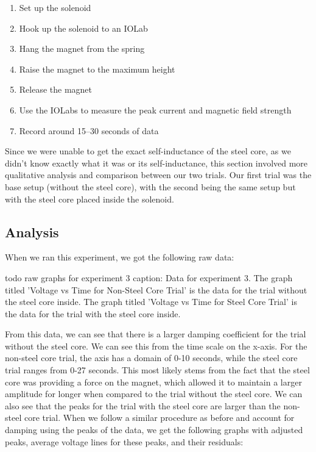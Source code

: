 \documentclass[11pt]{article}
\begin{document}
    \begin{enumerate}
        \item Set up the solenoid
        \item Hook up the solenoid to an IOLab
        \item Hang the magnet from the spring
        \item Raise the magnet to the maximum height
        \item Release the magnet
        \item Use the IOLabs to measure the peak current and magnetic field strength
        \item Record around 15--30 seconds of data
    \end{enumerate}

    Since we were unable to get the exact self-inductance of the steel core, as we didn't know exactly what it was or its self-inductance, this section involved more qualitative analysis and comparison between our two trials. Our first trial was the base setup (without the steel core), with the second being the same setup but with the steel core placed inside the solenoid.

    \subsection{Analysis}\label{subsec:part_3_analsysis}
    When we ran this experiment, we got the following raw data:

    todo raw graphs for experiment 3
    caption: Data for experiment 3. The graph titled 'Voltage vs Time for Non-Steel Core Trial' is the data for the trial without the steel core inside. The graph titled 'Voltage vs Time for Steel Core Trial' is the data for the trial with the steel core inside. 

    From this data, we can see that there is a larger damping coefficient for the trial without the steel core. We can see this from the time scale on the x-axis. For the non-steel core trial, the axis has a domain of 0-10 seconds, while the steel core trial ranges from 0-27 seconds. This most likely stems from the fact that the steel core was providing a force on the magnet, which allowed it to maintain a larger amplitude for longer when compared to the trial without the steel core.
    We can also see that the peaks for the trial with the steel core are larger than the non-steel core trial. When we follow a similar procedure as before and account for damping using the peaks of the data, we get the following graphs with adjusted peaks, average voltage lines for these peaks, and their residuals:
\end{document}
